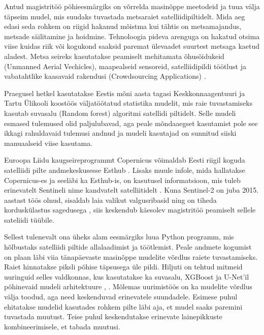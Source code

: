 Antud magistritöö põhieesmärgiks on võrrelda masinõppe meetodeid ja tuua välja täpseim mudel, mis suudaks tuvastada metsaraiet satelliidipiltidelt. Mida aeg edasi seda rohkem on riigid hakanud mõistma kui tähtis on metsamajandus, metsade säilitamine ja hoidmine. Tehnoloogia pideva arenguga on hakatud otsima viise kuidas riik või kogukond saaksid paremat ülevaadet suurtest metsaga kaetud aladest. Metsa seireks kasutatakse peamiselt mehitamata õhusõidukeid (Unmanned Aerial Vechicles), maapealseid sensoreid, satelliidipildi töötlust ja vabatahtlike kaasavaid rakendusi (Crowdsourcing Applications) \cite{cheungPerimeterDefense42015}.

Praegusel hetkel kasutatakse Eestis mõni aasta tagasi Keskkonnaagentuuri ja Tartu Ülikooli koostöös väljatöötatud statistika mudelit, mis raie tuvastamiseks kasutab suvasalu (Random forest) algoritmi \cite{TartuUlikooliTeadlased2020} satellidi piltidelt. Selle mudeli esmased tulemused olid paljulubavad, aga peale mõndaaegset kasutamist pole see ikkagi rahuldavaid tulemusi andnud ja mudeli kasutajad on sunnitud siiski manuaalseid viise kasutama.

Euroopa Liidu kaugseireprogrammt Copernicus võimaldab Eesti riigil koguda satelliidi pilte andmekeskusesse Esthub \cite{maa-ametRiiklikSatelliidiandmeteKeskus}. Lisaks muule infole, mida hallatakse Copernicus-es ja seeläbi ka Esthub-is, on kasutusel informatsioon, mis tuleb erinevatelt Sentineli nime kandvatelt satelliitidelt \cite{InfrastructureOverviewCopernicus}. Kuna Sentinel-2 on juba 2015. aastast töös olnud, sisaldab laia valikut valgusribasid ning on tiheda korduskülastus sagedusega \cite{Sentinel2OverviewScienceDirect}, siis keskendub käesolev magistritöö peamiselt sellele sateliidi tüübile.

Sellest tulenevalt ona üheks alam eesmärgiks luua Python programm, mis hõlbustaks satelliidi piltide allalaadimist ja töötlemist. Peale andmete kogumist on plaan läbi viia tänapäevaste masinõppe mudelite võrdlus raiete tuvastamiseks. Raiet hinnatakse piksli põhise täpsusega üle pildi. Hiljuti on tehtud mitmeid uuringuid selles valdkonnas, kus kasutatakse ka suvasalu, XGBoost ja U-Net’il põhinevaid mudeli arhitektuure \cite{isaienkovDeepLearningRegular2021}, \cite{podoprigorovaRecognitionForestDamage2024}. Mõlemas uurimistöös on ka mudelite võrdlus välja toodud, aga need keskenduvad erinevatele suundadele. Esimese puhul ehitatakse mudelid kasutades rohkem pilte läbi aja, et mudel saaks paremini tuvastada muutust. Teise puhul keskendutakse erinevate lainepikkuste kombineerimisele, et tabada muutusi. 

